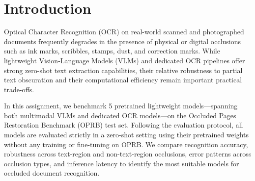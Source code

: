 \section{Introduction}
\label{sec:intro}

Optical Character Recognition (OCR) on real-world scanned and photographed documents frequently degrades in the presence of physical or digital occlusions such as ink marks, scribbles, stamps, dust, and correction marks. While lightweight Vision-Language Models (VLMs) and dedicated OCR pipelines offer strong zero-shot text extraction capabilities, their relative robustness to partial text obscuration and their computational efficiency remain important practical trade-offs.

In this assignment, we benchmark 5 pretrained lightweight models---spanning both multimodal VLMs and dedicated OCR models---on the Occluded Pages Restoration Benchmark (OPRB) test set. Following the evaluation protocol, all models are evaluated strictly in a zero-shot setting using their pretrained weights without any training or fine-tuning on OPRB. We compare recognition accuracy, robustness across text-region and non-text-region occlusions, error patterns across occlusion types, and inference latency to identify the most suitable models for occluded document recognition.
